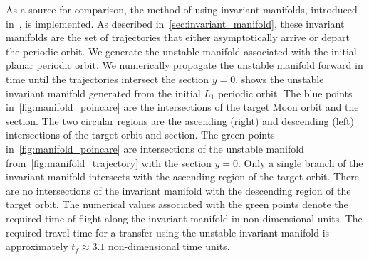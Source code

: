\documentclass[smallcondensed]{svjour3}
\begin{document}
As a source for comparison, the method of using invariant manifolds, introduced in~\cite{koon2011}, is implemented.
As described in~\cref{sec:invariant_manifold}, these invariant manifolds are the set of trajectories that either asymptotically arrive or depart the periodic orbit. 
We generate the unstable manifold associated with the initial planar periodic orbit.
We numerically propagate the unstable manifold forward in time until the trajectories intersect the \Poincare section \( y = 0 \).
 shows the unstable invariant manifold generated from the initial \( L_1\) periodic orbit. 
The blue points in~\cref{fig:manifold_poincare} are the intersections of the target Moon orbit and the \Poincare section.
The two circular regions are the ascending (right) and descending (left) intersections of the target orbit and \Poincare section.
The green points in~\cref{fig:manifold_poincare} are intersections of the unstable manifold from~\cref{fig:manifold_trajectory} with the \Poincare section \( y = 0 \).
Only a single branch of the invariant manifold intersects with the ascending region of the target orbit.
There are no intersections of the invariant manifold with the descending region of the target orbit.
The numerical values associated with the green points denote the required time of flight along the invariant manifold in non-dimensional units.
The required travel time for a transfer using the unstable invariant manifold is  approximately \( t_f \approx 3.1\) non-dimensional time units.
\end{document}
